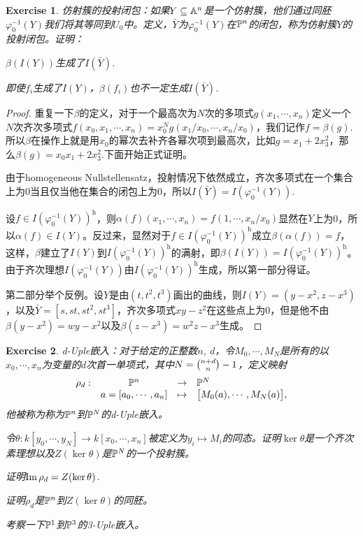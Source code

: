 \documentclass[9pt]{extarticle}
\theoremstyle{plain}%
\newtheorem{exe}{Exercise}[section]%
\begin{document}
\setcounter{exe}{8}
\begin{exe}
	仿射簇的投射闭包：如果$Y\subseteq \mathbb{A}^n$是一个仿射簇，他们通过同胚$\varphi_0^{-1}(Y)$我们将其等同到$U_0$中。定义，$\bar{Y}$为$\varphi_0^{-1}(Y)$在$\mathbb{P}^n$的闭包，称为仿射簇$Y$的投射闭包。证明：

	 $\beta(I(Y))$生成了$I(\bar{Y})$.

	 即使$f_i$生成了$I(Y)$，$\beta(f_i)$也不一定生成$I(\bar{Y})$.
\end{exe}
\begin{proof}
	重复一下$\beta$的定义，对于一个最高次为$N$次的多项式$g(x_1,\cdots ,x_n)$定义一个$N$次齐次多项式$f(x_0,x_1,\cdots ,x_n)=x_0^Ng(x_1/x_0,\cdots ,x_n/x_0)$，我们记作$f=\beta(g)$.所以$\beta$在操作上就是用$x_0$的幂次去补齐各幂次项到最高次，比如$g=x_1+2x_3^2$，那么$\beta(g)=x_0x_1+2x_3^2$.下面开始正式证明。

	由于homogeneous Nullstellensatz，投射情况下依然成立，齐次多项式在一个集合上为0当且仅当他在集合的闭包上为0，所以$I(\bar{Y})=I(\varphi_0^{-1}(Y))$.

	设$f\in I(\varphi_0^{-1}(Y))^\mathrm{h}$，则$\alpha(f)(x_1,\cdots,x_n)=f(1,\cdots,x_n/x_0)$显然在$Y$上为0，所以$\alpha(f)\in I(Y)$。反过来，显然对于$f\in I(\varphi_0^{-1}(Y))^\mathrm{h}$成立$\beta(\alpha(f))=f$，这样，$\beta$建立了$I(Y)$到$I(\varphi_0^{-1}(Y))^\mathrm{h}$的满射，即$\beta(I(Y))=I(\varphi_0^{-1}(Y))^\mathrm{h}$。由于齐次理想$I(\varphi_0^{-1}(Y))$由$I(\varphi_0^{-1}(Y))^\mathrm{h}$生成，所以第一部分得证。

	第二部分举个反例。设$Y$是由$(t,t^2,t^3)$画出的曲线，则$I(Y)=(y-x^2,z-x^3)$，以及$\bar{Y}=[s,st,st^2,st^3]$，齐次多项式$xy-z^2$在这些点上为$0$，但是他不由$\beta(y-x^2)=wy-x^2$以及$\beta(z-x^3)=w^2z-x^3$生成。
\end{proof}
\setcounter{exe}{11}
\begin{exe}
	d-Uple嵌入：对于给定的正整数$n$, $d$，令$M_0,\cdots,M_N$是所有的以$x_0,\cdots,x_n$为变量的$d$次首一单项式，其中$N=\tbinom{n+d}{n}-1$，定义映射
	\[
	\begin{array}{lccl}
		\rho_d:&\mathbb{P}^{n}&\to& \mathbb{P}^{N}\\
		&a=[a_0,\cdots ,a_n]&\mapsto&\bigl[M_0(a),\cdots ,M_N(a)\bigr],
	\end{array}
	\]
	他被称为称为$\mathbb{P}^{n}$到$\mathbb{P}^{N}$的d-Uple嵌入。

	 令$\theta:k[y_0,\cdots,y_N]\to k[x_0,\cdots,x_n]$被定义为$y_i\mapsto M_i$的同态。证明$\ker\theta$是一个齐次素理想以及$Z(\ker \theta)$是$\mathbb{P}^{N}$的一个投射簇。

	 证明$\operatorname{Im} \rho_d=Z(\ker \theta)$.
	
	 证明$\rho_d$是$\mathbb{P}^{n}$到$Z(\ker \theta)$的同胚。

	 考察一下$\mathbb{P}^{1}$到$\mathbb{P}^{3}$的3-Uple嵌入。
\end{exe}
\end{document}
